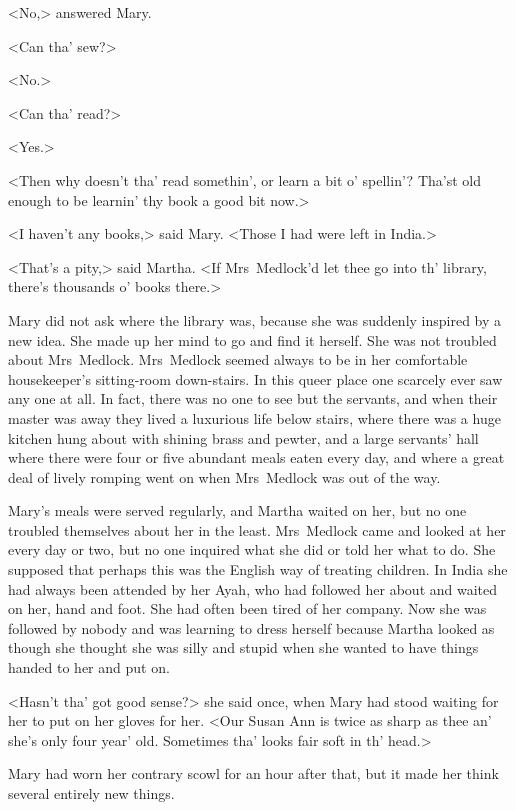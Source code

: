 <No,> answered Mary.

<Can tha' sew?>

<No.>

<Can tha' read?>

<Yes.>

<Then why doesn't tha' read somethin', or learn a bit o' spellin'? Tha'st old enough to be learnin' thy book a good bit now.>

<I haven't any books,> said Mary. <Those I had were left in India.>

<That's a pity,> said Martha. <If Mrs~Medlock'd let thee go into th' library, there's thousands o' books there.>

Mary did not ask where the library was, because she was suddenly inspired by a new idea. She made up her mind to go and find it herself. She was not troubled about Mrs~Medlock. Mrs~Medlock seemed always to be in her comfortable housekeeper's sitting-room down-stairs. In this queer place one scarcely ever saw any one at all. In fact, there was no one to see but the servants, and when their master was away they lived a luxurious life below stairs, where there was a huge kitchen hung about with shining brass and pewter, and a large servants' hall where there were four or five abundant meals eaten every day, and where a great deal of lively romping went on when Mrs~Medlock was out of the way.

Mary's meals were served regularly, and Martha waited on her, but no one troubled themselves about her in the least. Mrs~Medlock came and looked at her every day or two, but no one inquired what she did or told her what to do. She supposed that perhaps this was the English way of treating children. In India she had always been attended by her Ayah, who had followed her about and waited on her, hand and foot. She had often been tired of her company. Now she was followed by nobody and was learning to dress herself because Martha looked as though she thought she was silly and stupid when she wanted to have things handed to her and put on.

<Hasn't tha' got good sense?> she said once, when Mary had stood waiting for her to put on her gloves for her. <Our Susan Ann is twice as sharp as thee an' she's only four year' old. Sometimes tha' looks fair soft in th' head.>

Mary had worn her contrary scowl for an hour after that, but it made her think several entirely new things.

